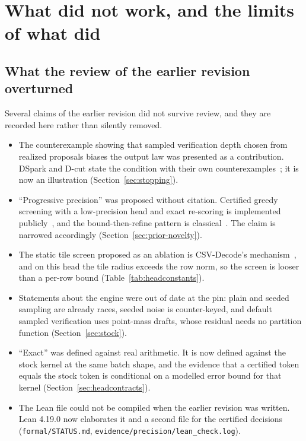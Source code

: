 \section{What did not work, and the limits of what did}\label{sec:limits}
\subsection{What the review of the earlier revision overturned}
Several claims of the earlier revision did not survive review, and they are recorded here rather than silently removed.
\begin{itemize}
\item The counterexample showing that sampled verification depth chosen from realized proposals biases the output law was presented as a contribution. DSpark and D-cut state the condition with their own counterexamples~\cite{dspark,dcut}; it is now an illustration (Section~\ref{sec:stopping}).
\item ``Progressive precision'' was proposed without citation. Certified greedy screening with a low-precision head and exact re-scoring is implemented publicly~\cite{sparkpipehead,dgpphead,lagunaprune,knlphead}, and the bound-then-refine pattern is classical~\cite{vafile,fexipro}. The claim is narrowed accordingly (Section~\ref{sec:prior-novelty}).
\item The static tile screen proposed as an ablation is CSV-Decode's mechanism~\cite{csvdecode}, and on this head the tile radius exceeds the row norm, so the screen is looser than a per-row bound (Table~\ref{tab:headconstants}).
\item Statements about the engine were out of date at the pin: plain and seeded sampling are already races, seeded noise is counter-keyed, and default sampled verification uses point-mass drafts, whose residual needs no partition function (Section~\ref{sec:stock}).
\item ``Exact'' was defined against real arithmetic. It is now defined against the stock kernel at the same batch shape, and the evidence that a certified token equals the stock token is conditional on a modelled error bound for that kernel (Section~\ref{sec:headcontracts}).
\item The Lean file could not be compiled when the earlier revision was written. Lean 4.19.0 now elaborates it and a second file for the certified decisions (\nolinkurl{formal/STATUS.md}, \nolinkurl{evidence/precision/lean_check.log}).
\end{itemize}

